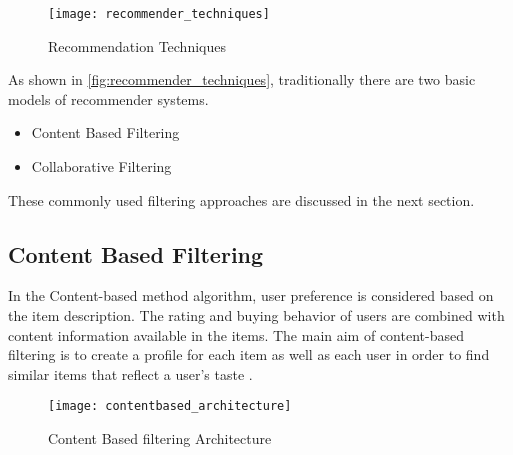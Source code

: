 \begin{figure}[H]
	\centering
	\texttt{[image: recommender\_techniques]}
	\caption{Recommendation Techniques \cite{33}}
	\label{fig:recommender_techniques}
\end{figure}


\noindent As shown in \autoref{fig:recommender_techniques}, traditionally there are two basic models of recommender systems. \begin{itemize} \item Content Based Filtering \item Collaborative Filtering \end{itemize}
These commonly used filtering approaches are discussed in the next section.
\pagebreak

\subsection{Content Based Filtering}
In the Content-based method algorithm, user preference is considered based on the item description. The rating and buying behavior of users are combined with content information available in the items. The main aim of content-based filtering is to create a profile for each item as well as each user in order to find similar items that reflect a user's taste \cite{6}.
\\

\begin{figure}[H]
	\centering
	\texttt{[image: contentbased\_architecture]}
	\caption{Content Based filtering Architecture \cite{5}}
	\label{fig:contentbased_architecture}
\end{figure}

